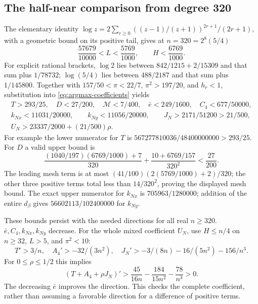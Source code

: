 \subsection{The half-near comparison from degree 320}
\label{app:argmax-half-near}

The elementary identity
$\log z=2\sum_{r\geq0}((z-1)/(z+1))^{2r+1}/(2r+1)$, with a
geometric bound on its positive tail, gives at $n=320=2^8(5/4)$
\[
 \frac{57679}{10000}<L<\frac{5769}{1000},\qquad H<\frac{6769}{1000}.
\]
For explicit rational brackets, $\log2$ lies between
$842/1215+2/15309$ and that sum plus $1/78732$; $\log(5/4)$ lies
between $488/2187$ and that sum plus $1/145800$.
Together with $157/50<\pi<22/7$, $\pi^2>197/20$, and $h_r<1$,
substitution into \eqref{eq:argmax-coefficients} yields
\begin{equation}
 \begin{gathered}
 T>293/25,\quad D<27/200,\quad\mathcal M<7/400,
 \quad\bar e<249/1600,\quad C_4<677/50000,\\
 k_{Nx}<11031/20000,\qquad k_{Ny}<11056/20000,
 \qquad J_N>2171/51200>21/500,\\
 U_N>23337/2000+(21/500)\rho.
 \end{gathered}                                      \label{eq:argmax-base320}
\end{equation}
For example the lower numerator for $T$ is
$567277810036/48400000000>293/25$.  For $D$ a valid upper bound is
\[
 \frac{(1040/197)(6769/1000)+7}{320}
       +\frac{10+6769/157}{320^2}<\frac{27}{200}.
\]
The leading mesh term is at most
$(41/100)(2(5769/1000)+2)/320$; the other three positive terms total
less than $14/320^2$, proving the displayed mesh bound.  The exact
upper numerator for $k_{Nx}$ is $705963/1280000$; addition of the
entire $d_\beta$ gives $56602113/102400000$ for $k_{Ny}$.

These bounds persist with the needed directions for all real $n\geq320$.
$\bar e,C_4,k_{Nx},k_{Ny}$ decrease.  For the whole mixed coefficient
$U_N$, use $H\leq n/4$ on $n\geq32$, $L>5$, and $\pi^2<10$:
\[
 T'>3/n,\quad A_4'>-32/(3n^2),\quad
 J_N'>-3/(8n)-16/(5n^2)-156/n^3.
\]
For $0\leq\rho\leq1/2$ this implies
\[
 (T+A_4+\rho J_N)'
 >\frac{45}{16n}-\frac{184}{15n^2}-\frac{78}{n^3}>0.
\]
The decreasing $\bar e$ improves the direction.  This checks the
complete coefficient, rather than assuming a favorable direction for
a difference of positive terms.

